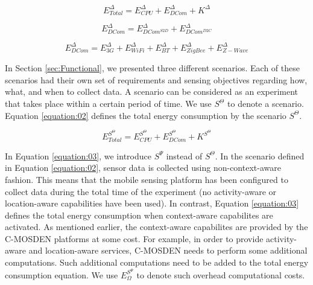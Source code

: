 \documentclass[journal]{IEEEtran}
\begin{document}
\begin{equation}
\label{equation:01}
E_{Total}^{\Delta} = E_{CPU}^{\Delta} + E_{DCom}^{\Delta}   + K^{\Delta}
\end{equation}


\begin{equation}
\label{equation:01_2}
E_{DCom}^{\Delta}  =  E_{DCom^{S2D}}^{\Delta} + E_{DCom^{D2C}}^{\Delta}
\end{equation}

\begin{equation}
\label{equation:01_3}
E_{DCom}^{\Delta}  =  E_{3G}^{\Delta} + E_{WiFi}^{\Delta} +  E_{BT}^{\Delta} + E_{ZigBee}^{\Delta} + E_{Z-Wave}^{\Delta}
\end{equation}



In Section \ref{sec:Functional}, we presented three different scenarios. Each of these scenarios had their own set of requirements and sensing objectives regarding how, what, and when to collect data. A scenario can be considered as an experiment that takes place within a certain period of time. We use $S^{\Theta}$ to denote a scenario. Equation \ref{equation:02} defines the total energy consumption by the scenario $S^{\Theta}$.





\begin{equation}
\label{equation:02}
E_{Total}^{S^{\Theta}} = E_{CPU}^{S^{\Theta}} + E_{DCom}^{S^{\Theta}}  +  K^{S^{\Theta}}
\end{equation}

In Equation \ref{equation:03}, we introduce $S^{\Psi}$ instead of $S^{\Theta}$. In the scenario defined in  Equation \ref{equation:02}, sensor data is collected using non-context-aware fashion. This means that the mobile sensing platform has been configured to collect data during the total time of the experiment (no activity-aware or location-aware capabilities have been used). In contrast, Equation \ref{equation:03} defines the total energy consumption when context-aware capabilites are activated. As  mentioned earlier, the context-aware capabilites are provided by the C-MOSDEN platforms at some cost. For example, in order to provide activity-aware and location-aware services, C-MOSDEN needs to perform some additional computations. Such additional computations need to be added to the total energy consumption equation. We use $E_{\Omega}^{S^{\Psi}}$ to denote such overhead computational costs.
\end{document}
